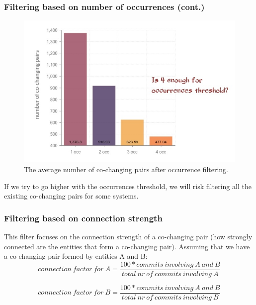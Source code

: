 \documentclass{beamer}
\begin{document}
 \begin{frame}
\frametitle{Filtering based on number of occurrences (cont.)}

\begin{center}
     \begin{figure}
	\includegraphics[scale=0.45]{occ2.jpg}
	\caption{\label{fig:fig1}The average number of co-changing pairs after occurrence filtering.}
     \end{figure}
\end{center}
If we try to go higher with the occurrences threshold, we will risk filtering all the existing co-changing pairs for some systems.
\end{frame}

 \begin{frame}
\frametitle{Filtering based on connection strength}

This filter focuses on the connection strength of a co-changing pair (how strongly connected are the entities that form a co-changing pair).
Assuming that we have a co-changing pair formed by entities A and B:
\begin{equation}
 connection\ factor\ for\ A = \frac{100 * commits\ involving\ A\ and\ B}{total\ nr\ of\ commits\ involving\ A}
\end{equation}

\begin{equation}
 connection\ factor\ for\ B = \frac{100 * commits\ involving\ A\ and\ B}{total\ nr\ of\ commits\ involving\ B}
\end{equation}
\end{frame}
\end{document}
